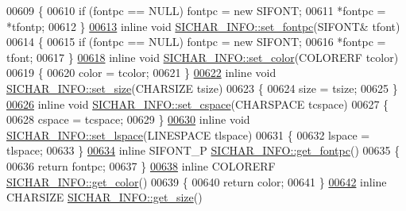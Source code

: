 \begin{DoxyCode}
00609 \{
00610     \textcolor{keywordflow}{if} (fontpc == NULL) fontpc = \textcolor{keyword}{new} SIFONT;
00611     *fontpc = *tfontp;
00612 \}
\hyperlink{class_s_i_c_h_a_r___i_n_f_o_a01ad1057400db3ccec680de26f4ab0a2}{00613} \textcolor{keyword}{inline} \textcolor{keywordtype}{void} \hyperlink{class_s_i_c_h_a_r___i_n_f_o_a7dd5af8833b1951a6e4759668d484f37}{SICHAR\_INFO::set\_fontpc}(SIFONT& tfont)
00614 \{
00615     \textcolor{keywordflow}{if} (fontpc == NULL) fontpc = \textcolor{keyword}{new} SIFONT;
00616     *fontpc = tfont;
00617 \}
\hyperlink{class_s_i_c_h_a_r___i_n_f_o_a3c7718568eb9ff885af1bdfa8c197236}{00618} \textcolor{keyword}{inline} \textcolor{keywordtype}{void} \hyperlink{class_s_i_c_h_a_r___i_n_f_o_a3c7718568eb9ff885af1bdfa8c197236}{SICHAR\_INFO::set\_color}(COLORERF tcolor)
00619 \{
00620     color = tcolor;
00621 \}
\hyperlink{class_s_i_c_h_a_r___i_n_f_o_afe883164593a8d3a5c9377eb5454c9f1}{00622} \textcolor{keyword}{inline} \textcolor{keywordtype}{void} \hyperlink{class_s_i_c_h_a_r___i_n_f_o_afe883164593a8d3a5c9377eb5454c9f1}{SICHAR\_INFO::set\_size}(CHARSIZE tsize)
00623 \{
00624     size = tsize;
00625 \}
\hyperlink{class_s_i_c_h_a_r___i_n_f_o_a18aaf35f07094cb42942663a71456227}{00626} \textcolor{keyword}{inline} \textcolor{keywordtype}{void} \hyperlink{class_s_i_c_h_a_r___i_n_f_o_a18aaf35f07094cb42942663a71456227}{SICHAR\_INFO::set\_cspace}(CHARSPACE tcspace)
00627 \{
00628     cspace = tcspace;
00629 \}
\hyperlink{class_s_i_c_h_a_r___i_n_f_o_af38e1eac74e8d9c14e5c5d05d58f8b36}{00630} \textcolor{keyword}{inline} \textcolor{keywordtype}{void} \hyperlink{class_s_i_c_h_a_r___i_n_f_o_af38e1eac74e8d9c14e5c5d05d58f8b36}{SICHAR\_INFO::set\_lspace}(LINESPACE tlspace)
00631 \{
00632     lspace = tlspace;
00633 \}
\hyperlink{class_s_i_c_h_a_r___i_n_f_o_ad53aa1c6641e81bf0b79f17836aa5dfa}{00634} \textcolor{keyword}{inline} SIFONT\_P \hyperlink{class_s_i_c_h_a_r___i_n_f_o_ad53aa1c6641e81bf0b79f17836aa5dfa}{SICHAR\_INFO::get\_fontpc}()
00635 \{
00636     \textcolor{keywordflow}{return} fontpc;
00637 \}
\hyperlink{class_s_i_c_h_a_r___i_n_f_o_acd6d47c6cf5f266e18033e45763d6272}{00638} \textcolor{keyword}{inline} COLORERF \hyperlink{class_s_i_c_h_a_r___i_n_f_o_acd6d47c6cf5f266e18033e45763d6272}{SICHAR\_INFO::get\_color}()
00639 \{
00640     \textcolor{keywordflow}{return} color;
00641 \}
\hyperlink{class_s_i_c_h_a_r___i_n_f_o_aae2cfbd0b6bbb122008da027f662291b}{00642} \textcolor{keyword}{inline} CHARSIZE \hyperlink{class_s_i_c_h_a_r___i_n_f_o_aae2cfbd0b6bbb122008da027f662291b}{SICHAR\_INFO::get\_size}()

\end{DoxyCode}

